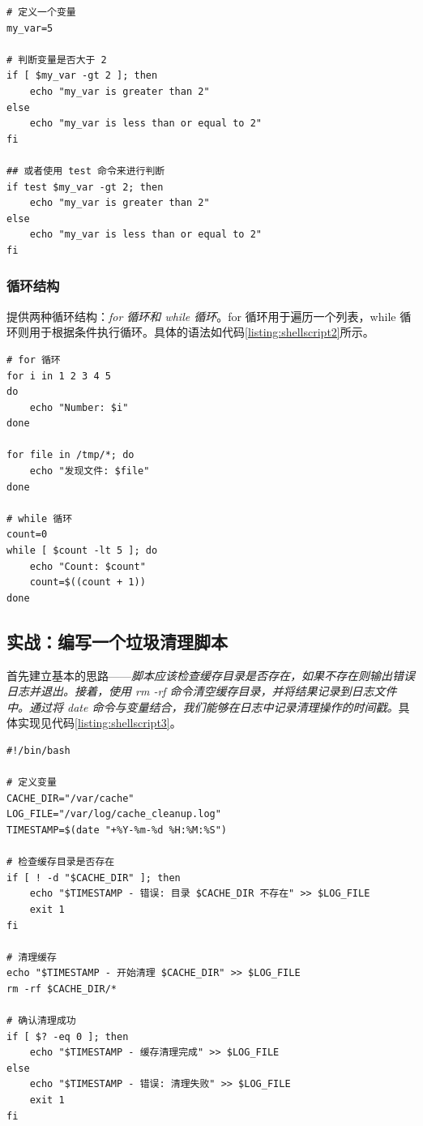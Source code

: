 \begin{longlisting}
    \begin{verbatim}
# 定义一个变量
my_var=5

# 判断变量是否大于 2
if [ $my_var -gt 2 ]; then
    echo "my_var is greater than 2"
else
    echo "my_var is less than or equal to 2"
fi

## 或者使用 test 命令来进行判断
if test $my_var -gt 2; then
    echo "my_var is greater than 2"
else
    echo "my_var is less than or equal to 2"
fi
    \end{verbatim}
    \caption{Shell脚本基本语法示例一}
    \label{listing:shellscript1}
\end{longlisting}

\subsubsection{循环结构}

提供两种循环结构：\textit{for 循环和 while 循环}。for 循环用于遍历一个列表，while 循环则用于根据条件执行循环。具体的语法如代码\ref{listing:shellscript2}所示。

\begin{longlisting}
    \begin{verbatim}
# for 循环
for i in 1 2 3 4 5
do
    echo "Number: $i"
done

for file in /tmp/*; do
    echo "发现文件: $file"
done

# while 循环
count=0
while [ $count -lt 5 ]; do
    echo "Count: $count"
    count=$((count + 1))
done
    \end{verbatim}
    \caption{Shell脚本基本语法示例二}
    \label{listing:shellscript2}
\end{longlisting}

\subsection{实战：编写一个垃圾清理脚本}

首先建立基本的思路——\textit{脚本应该检查缓存目录是否存在，如果不存在则输出错误日志并退出。接着，使用 rm -rf 命令清空缓存目录，并将结果记录到日志文件中。通过将 date 命令与变量结合，我们能够在日志中记录清理操作的时间戳。}具体实现见代码\ref{listing:shellscript3}。

\begin{longlisting}
    \begin{verbatim}
#!/bin/bash

# 定义变量
CACHE_DIR="/var/cache"
LOG_FILE="/var/log/cache_cleanup.log"
TIMESTAMP=$(date "+%Y-%m-%d %H:%M:%S")

# 检查缓存目录是否存在
if [ ! -d "$CACHE_DIR" ]; then
    echo "$TIMESTAMP - 错误: 目录 $CACHE_DIR 不存在" >> $LOG_FILE
    exit 1
fi

# 清理缓存
echo "$TIMESTAMP - 开始清理 $CACHE_DIR" >> $LOG_FILE
rm -rf $CACHE_DIR/*

# 确认清理成功
if [ $? -eq 0 ]; then
    echo "$TIMESTAMP - 缓存清理完成" >> $LOG_FILE
else
    echo "$TIMESTAMP - 错误: 清理失败" >> $LOG_FILE
    exit 1
fi
    \end{verbatim}
    \caption{Shell脚本实战：垃圾清理脚本}
    \label{listing:shellscript3}
\end{longlisting}

